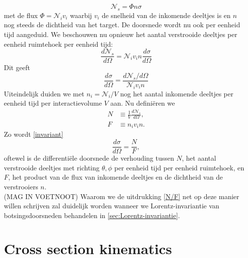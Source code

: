 \documentclass[11pt]{article}
\numberwithin{equation}{section}
\begin{document}
\begin{equation}
	\mathcal{N}_s = \Phi n \sigma
\end{equation}
met de flux $\Phi = \mathcal{N}_i v_i$ waarbij $v_i$ de snelheid van de inkomende deeltjes is en $n$ nog steeds de dichtheid van het target. De doorsnede wordt nu ook per eenheid tijd aangeduid. We beschouwen nu opnieuw het aantal verstrooide deeltjes per eenheid ruimtehoek per eenheid tijd:
\begin{equation}
	\frac{d\mathcal{N}_s}{d\Omega} = \mathcal{N}_i v_i n \frac{d\sigma}{d\Omega}
\end{equation}
Dit geeft
\begin{equation}\label{invariant}
	\frac{d\sigma}{d\Omega} = \frac{d\mathcal{N}_s/d\Omega}{\mathcal{N}_i v_i n}
\end{equation}
Uiteindelijk duiden we met $n_i = \mathcal{N}_i / V$ nog het aantal inkomende deeltjes per eenheid tijd per interactievolume $V$ aan. Nu defini\"eren we
\begin{align}	
N &\equiv \frac{1}{V}\frac{d\mathcal{N}_s}{d\Omega},\\
F &\equiv n_i v_i n.
\end{align}
Zo wordt \eqref{invariant}
\begin{equation}\label{N/F}
	\frac{d\sigma}{d\Omega} = \frac{N}{F},
\end{equation}
oftewel is de differenti\"ele doorsnede de verhouding tussen $N$, het aantal verstrooide deeltjes met richting $ \theta , \phi$ per eenheid tijd per eenheid ruimtehoek, en $F$, het product van de flux van inkomende deeltjes en de dichtheid van de verstrooiers $n$. \\
(MAG IN VOETNOOT)
Waarom we de uitdrukking \eqref{N/F} net op deze manier willen schrijven zal duidelijk worden wanneer we Lorentz-invariantie van botsingsdoorsneden behandelen in \ref{sec:Lorentz-invariantie}.




\section{Cross section kinematics}
\end{document}

